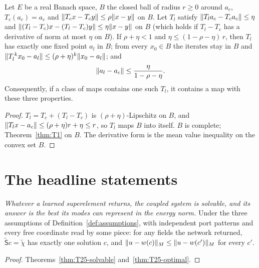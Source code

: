 \begin{theorem}[T2, conditional]\label{thm:T2}
  \leanok
  Let $E$ be a real Banach space, $B$ the closed ball of radius $r\ge0$
  around $a_c$, $T_c(a_c)=a_c$ and
  $\lVert T_cx-T_cy\rVert\le\rho\lVert x-y\rVert$ on $B$.  Let $T_l$ satisfy
  $\lVert T_la_c-T_ca_c\rVert\le\eta$ and
  $\lVert (T_l-T_c)x-(T_l-T_c)y\rVert\le\eta\lVert x-y\rVert$ on $B$ (which holds if
  $T_l-T_c$ has a derivative of norm at most $\eta$ on $B$).  If
  $\rho+\eta<1$ and $\eta\le(1-\rho-\eta)\,r$, then $T_l$ has exactly one
  fixed point $a_l$ in $B$; from every $x_0\in B$ the iterates stay in $B$ and
  $\lVert T_l^{\,k}x_0-a_l\rVert\le(\rho+\eta)^k\lVert x_0-a_l\rVert$; and
  \[
    \lVert a_l-a_c\rVert\le\frac{\eta}{1-\rho-\eta}.
  \]
  Consequently, if a class of maps contains one such $T_l$, it contains a map
  with these three properties.
\end{theorem}

\begin{proof}
  \leanok
  $T_l=T_c+(T_l-T_c)$ is $(\rho+\eta)$-Lipschitz on $B$, and
  $\lVert T_lx-a_c\rVert\le(\rho+\eta)r+\eta\le r$, so $T_l$ maps $B$ into itself.
  $B$ is complete; Theorem~\ref{thm:T1} on $B$.  The derivative form is the
  mean value inequality on the convex set $B$.
\end{proof}

\section{The headline statements}

\begin{theorem}\label{thm:headline-tier0}
  \leanok
  \emph{Whatever a learned superelement returns, the coupled system is
  solvable, and its answer is the best its modes can represent in the energy
  norm.}  Under the three assumptions of Definition~\ref{def:assumptions},
  with independent port patterns and every free coordinate read by some piece:
  for any fields the network returned, $\tilde{\mathsf S}c=\tilde\chi$ has
  exactly one solution $c$, and
  $\lVert u-w(c)\rVert_M\le\lVert u-w(c')\rVert_M$ for every $c'$.
\end{theorem}

\begin{proof}
  \leanok
  Theorems~\ref{thm:T25-solvable} and~\ref{thm:T25-optimal}.
\end{proof}

